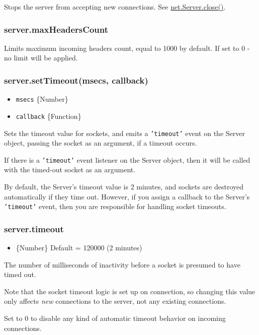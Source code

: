 Stops the server from accepting new connections. See
\href{net.html\#net\_server\_close\_callback}{net.Server.close()}.

\subsubsection{server.maxHeadersCount}

Limits maximum incoming headers count, equal to 1000 by default. If set
to 0 - no limit will be applied.

\subsubsection{server.setTimeout(msecs, callback)}

\begin{itemize}
\item
  \texttt{msecs} \{Number\}
\item
  \texttt{callback} \{Function\}
\end{itemize}

Sets the timeout value for sockets, and emits a \texttt{'timeout'} event
on the Server object, passing the socket as an argument, if a timeout
occurs.

If there is a \texttt{'timeout'} event listener on the Server object,
then it will be called with the timed-out socket as an argument.

By default, the Server's timeout value is 2 minutes, and sockets are
destroyed automatically if they time out. However, if you assign a
callback to the Server's \texttt{'timeout'} event, then you are
responsible for handling socket timeouts.

\subsubsection{server.timeout}

\begin{itemize}
\item
  \{Number\} Default = 120000 (2 minutes)
\end{itemize}

The number of milliseconds of inactivity before a socket is presumed to
have timed out.

Note that the socket timeout logic is set up on connection, so changing
this value only affects \emph{new} connections to the server, not any
existing connections.

Set to 0 to disable any kind of automatic timeout behavior on incoming
connections.

